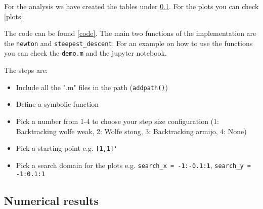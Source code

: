 \documentclass[a4paper,11pt]{article}
\numberwithin{equation}{section} %
\begin{document}
For the analysis we have created the tables under \ref{simulation1}. For the plots you can check \ref{plots}.

The code can be found \ref{code}.
The main two functions of the implementation are the \verb|newton| and \verb|steepest_descent|. For an example on how to use the functions you can check the \verb|demo.m| and the jupyter notebook.

The steps are:
\begin{itemize}
    \item Include all the ".m" files in the path (\verb|addpath()|)
    \item Define a symbolic function
    \item Pick a number from 1-4 to choose your step size configuration (1: Backtracking wolfe weak, 2: Wolfe stong, 3: Backtracking armijo, 4: None)
    \item Pick a starting point e.g. \verb|[1,1]'|
    \item Pick a search domain for the plots e.g. \verb|search_x = -1:-0.1:1|, \verb|search_y = -1:0.1:1|
\end{itemize}



\subsection{Numerical results}
\label{simulation1}
\end{document}
